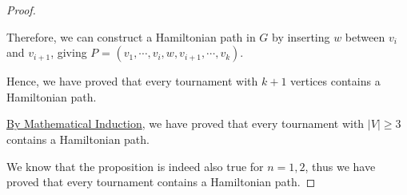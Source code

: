 \documentclass{article}
\begin{document}
\begin{proof}
\begin{enumerate}[label=Case \arabic*:]
        Therefore, we can construct a Hamiltonian path in $G$ by inserting $w$ between $v_i$ and $v_{i+1}$, giving $P$ = $(v_1, \cdots, v_i, w, v_{i+1}, \cdots, v_k)$.
    \end{enumerate}
    
    Hence, we have proved that every tournament with $k+1$ vertices contains a Hamiltonian path.
    
    \underline{By Mathematical Induction}, we have proved that every tournament with $|V| \ge 3$ contains a Hamiltonian path.

    We know that the proposition is indeed also true for $n=1,2$, thus we have proved that every tournament contains a Hamiltonian path.
\end{proof}
\end{document}

